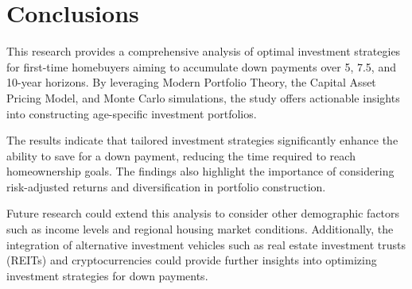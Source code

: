 \section{Conclusions}

This research provides a comprehensive analysis of optimal investment strategies for first-time homebuyers aiming to accumulate down payments over 5, 7.5, and 10-year horizons. By leveraging Modern Portfolio Theory, the Capital Asset Pricing Model, and Monte Carlo simulations, the study offers actionable insights into constructing age-specific investment portfolios.

The results indicate that tailored investment strategies significantly enhance the ability to save for a down payment, reducing the time required to reach homeownership goals. The findings also highlight the importance of considering risk-adjusted returns and diversification in portfolio construction.

Future research could extend this analysis to consider other demographic factors such as income levels and regional housing market conditions. Additionally, the integration of alternative investment vehicles such as real estate investment trusts (REITs) and cryptocurrencies could provide further insights into optimizing investment strategies for down payments.

\newpage
